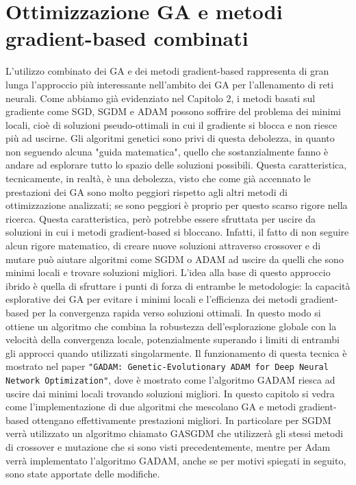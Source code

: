 \section{Ottimizzazione GA e metodi gradient-based combinati}
 L'utilizzo combinato dei GA e dei metodi gradient-based rappresenta di gran lunga l'approccio più interessante nell'ambito dei GA per l'allenamento di reti neurali. Come abbiamo già evidenziato
 nel Capitolo 2, i metodi basati sul gradiente come SGD, SGDM e ADAM possono soffrire del problema dei minimi locali, cioè di soluzioni pseudo-ottimali in cui il gradiente si blocca
 e non riesce più ad uscirne. Gli algoritmi genetici sono privi di questa debolezza, in quanto non seguendo alcuna "guida matematica", quello che sostanzialmente fanno
 è andare ad esplorare tutto lo spazio delle soluzioni possibili.
 Questa caratteristica, tecnicamente, in realtà, è una debolezza, visto che come già accennato le prestazioni dei GA sono
 molto peggiori rispetto agli altri metodi di ottimizzazione analizzati; se sono peggiori è proprio per questo scarso rigore nella ricerca. Questa caratteristica, però potrebbe essere sfruttata per uscire da soluzioni in cui i metodi gradient-based si bloccano.
 Infatti, il fatto di non seguire alcun rigore
 matematico, di creare nuove soluzioni attraverso crossover e di mutare può aiutare algoritmi come SGDM o ADAM ad uscire da quelli che sono
 minimi locali e trovare soluzioni migliori.
 L'idea alla base di questo approccio ibrido è quella di sfruttare i punti di forza di entrambe le metodologie: la capacità esplorative dei GA per evitare i minimi locali e l'efficienza
 dei metodi gradient-based per la convergenza rapida verso soluzioni ottimali. In questo modo si ottiene un algoritmo che combina la robustezza dell'esplorazione globale con la
 velocità della convergenza locale, potenzialmente superando i limiti di entrambi gli approcci quando utilizzati singolarmente.
 Il funzionamento di questa tecnica è mostrato nel paper \texttt{"GADAM: Genetic-Evolutionary ADAM for Deep Neural Network Optimization"}, dove è mostrato 
 come l'algoritmo GADAM riesca ad uscire dai minimi locali trovando soluzioni migliori.
 In questo capitolo si vedra come l'implementazione di due algoritmi che mescolano GA e metodi gradient-based ottengano effettivamente prestazioni migliori. In particolare
 per  SGDM verrà utilizzato un algoritmo chiamato GASGDM che utilizzerà gli stessi metodi di crossover e mutazione che si sono visti precedentemente, mentre per Adam
 verrà implementato l'algoritmo GADAM, anche se per motivi spiegati in seguito, sono state apportate delle modifiche.




